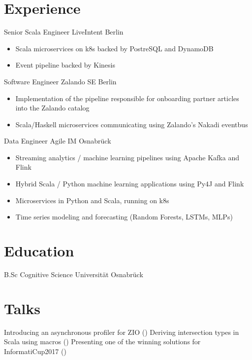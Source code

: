 \documentclass[10pt,a4paper,sans]{moderncv}
\begin{document}
\makecvtitle

\section{Experience}
        {Senior Scala Engineer}
        {LiveIntent}
        {Berlin}
        {}
        {
          \begin{itemize}
            \item Scala microservices on k8s backed by PostreSQL and DynamoDB
            \item Event pipeline backed by Kinesis
          \end{itemize}
        }
        {Software Engineer}
        {Zalando SE}
        {Berlin}
        {}
        {
          \begin{itemize}
            \item Implementation of the pipeline responsible for onboarding partner articles into the Zalando catalog
            \item Scala/Haskell microservices communicating using Zalando's Nakadi eventbus
          \end{itemize}
        }
        {Data Engineer}
        {Agile IM}
        {Osnabrück}
        {}
        {
          \begin{itemize}
            \item Streaming analytics / machine learning pipelines using Apache Kafka and Flink
            \item Hybrid Scala / Python machine learning applications using Py4J and Flink
            \item Microservices in Python and Scala, running on k8s
            \item Time series modeling and forecasting (Random Forests, LSTMs, MLPs)
          \end{itemize}
        }

\section{Education}
\cventry{}
        {B.Sc Cognitive Science}
        {Universität Osnabrück}
        {}
        {}
        {}

\section{Talks}
       {Introducing an asynchronous profiler for ZIO ()}
       {Deriving intersection types in Scala using macros ()}
       {Presenting one of the winning solutions for InformatiCup2017 ()}
\end{document}
